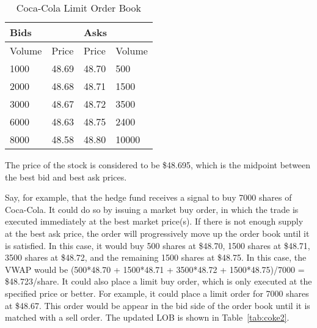 \begin{table}[htbp]
\caption{Coca-Cola Limit Order Book} \label{tab:coke1}
\begin{center}
\begin{tabular}{ll|ll}
\hline \hline
\multicolumn{2}{l|}{\textbf{Bids}} & \multicolumn{2}{l}{\textbf{Asks}} \\
\hline
Volume           & Price          & Price           & Volume          \\
\hline
1000             & 48.69          & 48.70           & 500             \\
2000             & 48.68          & 48.71           & 1500            \\
3000             & 48.67          & 48.72           & 3500            \\
6000             & 48.63          & 48.75           & 2400            \\
8000             & 48.58          & 48.80           & 10000          
\end{tabular}
\end{center}
\end{table}

The price of the stock is considered to be \$48.695, which is the midpoint between the best bid and best ask prices. 

Say, for example, that the hedge fund receives a signal to buy 7000 shares of Coca-Cola. It could do so by issuing a market buy order, in which the trade is executed immediately at the best market price(s). If there is not enough supply at the best ask price, the order will progressively move up the order book until it is satisfied. In this case, it would buy 500 shares at \$48.70, 1500 shares at \$48.71, 3500 shares at \$48.72, and the remaining 1500 shares at \$48.75. In this case, the VWAP would be (500*48.70 + 1500*48.71 + 3500*48.72 + 1500*48.75)/7000 = \$48.723/share. It could also place a limit buy order, which is only executed at the specified price or better. For example, it could place a limit order for 7000 shares at \$48.67. This order would be appear in the bid side of the order book until it is matched with a sell order. The updated LOB is shown in Table~\ref{tab:coke2}.

